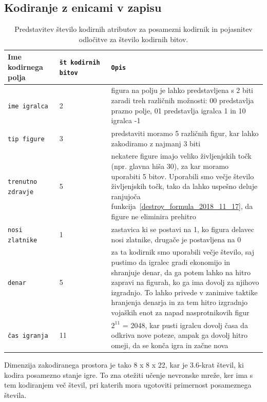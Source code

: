 \documentclass[a4paper, 12pt]{book}
\begin{document}
\subsection{Kodiranje z enicami v zapisu}
\label{oneHotEncoder}
\begin{table}
	\begin{center}
		\begin{tabular}{p{0.2\linewidth}|p{0.2\linewidth}|p{0.6\linewidth}}
			Ime kodirnega polja      & {\tt št kodirnih bitov} & {\tt Opis} \\ \hline
			{\tt ime igralca}        & 2                       & figura na polju je lahko predstavljena s 2 biti zaradi treh različnih možnosti: 00 predstavlja prazno polje, 01 predstavlja igralca 1 in 10 igralca -1 \\
			{\tt tip figure}         & 3                       & predstaviti moramo 5 različnih figur, kar lahko zakodiramo z najmanj 3 biti\\
			{\tt trenutno zdravje}   & 5                       & nekatere figure imajo veliko življenjskih točk (npr. glavna hiša 30), za kar moramo uporabiti 5 bitov. 
																 Uporabili smo večje število življenjskih točk, tako da lahko uspešno deluje ranjujoča funkcija~\ref{destroy_formula_2018_11_17}, da figure ne eliminira prehitro \\
			{\tt nosi zlatnike}      & 1                       & zastavica ki se postavi na 1, ko figura delavec nosi zlatnike, drugače je postavljena na 0 \\
			{\tt denar}              & 5                       & za ta kodirnik smo uporabili večje število, saj pustimo da igralec gradi ekonomijo in shranjuje denar, da ga potem lahko na hitro zapravi na figurah, ko ga ima dovolj za njihovo izgradnjo.
																 To lahko privede v zanimive taktike hranjenja denarja in za tem hitro izgradnjo vojaških enot za napad nasprotnikovih figur \\
			{\tt čas igranja}        & 11                      & $2^{11}$ = 2048, kar pusti igralcu dovolj časa da odkriva nove poteze, ampak ga dovolj hitro omeji, da se konča igra in začne nova \\
		\end{tabular}
	\end{center}
	\caption{Predstavitev število kodirnih atributov za posamezni kodirnik in pojasnitev odločitve za število kodirnih bitov. }
	\label{tableEncodersOneHot}
\end{table}

Dimenzija zakodiranega prostora je tako 8 x 8 x 22, kar je 3.6-krat števil, ki kodira posamezno stanje igre.
To zna otežiti učenje nevronske mreže, ker ima s tem kodiranjem več števil, pri katerih mora ugotoviti primernost posameznega števila.
\end{document}
